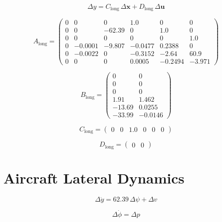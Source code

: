\documentclass{article}
\begin{document}
\begin{dmath}
\Delta y = C_{\mathrm{long}}\,\Delta\bm{x} + D_{\mathrm{long}}\,\Delta\bm{u}
\end{dmath}

\begin{dmath}
A_{\mathrm{long}}=\left(\begin{array}{cccccc} 0 & 0 & 0 & 1.0 & 0 & 0\\ 0 & 0 & -62.39 & 0 & 1.0 & 0\\ 0 & 0 & 0 & 0 & 0 & 1.0\\ 0 & -0.0001 & -9.807 & -0.0477 & 0.2388 & 0\\ 0 & -0.0022 & 0 & -0.3152 & -2.64 & 60.9\\ 0 & 0 & 0 & 0.0005 & -0.2494 & -3.971 \end{array}\right)
\end{dmath}

\begin{dmath}
B_{\mathrm{long}}=\left(\begin{array}{cc} 0 & 0\\ 0 & 0\\ 0 & 0\\ 1.91 & 1.462\\ -13.69 & 0.0255\\ -33.99 & -0.0146 \end{array}\right)
\end{dmath}

\begin{dmath}
C_{\mathrm{long}}=\left(\begin{array}{cccccc} 0 & 0 & 1.0 & 0 & 0 & 0 \end{array}\right)
\end{dmath}

\begin{dmath}
D_{\mathrm{long}}=\left(\begin{array}{cc} 0 & 0 \end{array}\right)
\end{dmath}

\newpage

\section{Aircraft Lateral Dynamics}

\begin{dmath}
\Delta \dot{y}=62.39\,\Delta \psi +\Delta v
\end{dmath}

\begin{dmath}
\Delta \dot{\phi }=\Delta p
\end{dmath}
\end{document}
